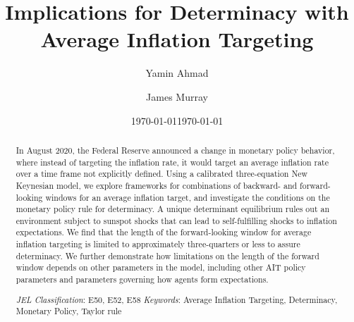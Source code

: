 \documentclass[english,authoryear,12pt]{elsarticle}
\begin{document}
	\begin{frontmatter}
		\title{Implications for Determinacy with Average Inflation Targeting}
		\date{\today}
		\author[1]{Yamin Ahmad}
		\author[2]{James Murray}

		\address[1]{Dept. of Economics, University of Wisconsin - Whitewater, 809 W. Starin Road, Whitewater, WI 53190, USA}
		\address[2]{Dept. of Economics, University of Wisconsin - La Crosse, 1725 State St., La Crosse, WI 54601, USA}

	\date{\today}

	\begin{abstract}
		In August 2020, the Federal Reserve announced a change in monetary policy behavior, where instead of targeting the inflation rate, it would target an average inflation rate over a time frame not explicitly defined. Using a calibrated three-equation New Keynesian model, we explore frameworks for combinations of backward- and forward-looking windows for an average inflation target, and investigate the conditions on the monetary policy rule for determinacy. A unique determinant equilibrium rules out an environment subject to sunspot shocks that can lead to self-fulfilling shocks to inflation expectations. We find that the length of the forward-looking window for average inflation targeting is limited to approximately three-quarters or less to assure determinacy. We further demonstrate how limitations on the length of the forward window depends on other parameters in the model, including other AIT policy parameters and parameters governing how agents form expectations.

		\begin{flushleft}
			{\it JEL Classification}: E50, E52, E58 \newline
			{\it Keywords}: Average Inflation Targeting, Determinacy, Monetary Policy, Taylor rule
		\end{flushleft}
	\end{abstract}

\end{frontmatter}

\renewcommand{\thefootnote}{\arabic{footnote}}%
\setcounter{page}{1}%
\setcounter{footnote}{0}%
\end{document}
